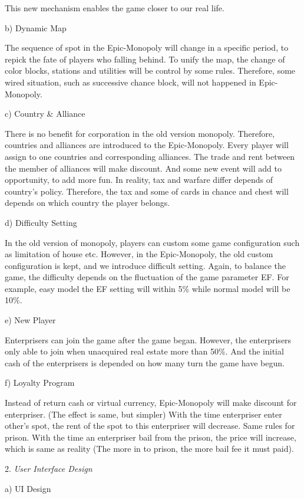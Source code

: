 \documentclass[a4paper,11pt]{article}
\begin{document}
This new mechanism enables the game closer to our real life.

b)	Dynamic Map

The sequence of spot in the Epic-Monopoly will change in a specific period, to repick the fate of players who falling behind. To unify the map, the change of color blocks, stations and utilities will be control by some rules. Therefore, some wired situation, such as successive chance block, will not happened in Epic-Monopoly.

c)	Country \& Alliance

There is no benefit for corporation in the old version monopoly. Therefore, countries and alliances are introduced to the Epic-Monopoly. Every player will assign to one countries and corresponding alliances. The trade and rent between the member of alliances will make discount. And some new event will add to opportunity, to add more fun. In reality, tax and warfare differ depends of country's policy. Therefore, the tax and some of cards in chance and chest will depends on which country the player belongs.

d)	Difficulty Setting

In the old version of monopoly, players can custom some game configuration such as limitation of house etc. However, in the Epic-Monopoly, the old custom configuration is kept, and we introduce difficult setting. Again, to balance the game, the difficulty depends on the fluctuation of the game parameter EF. For example, easy model the EF setting will within 5\% while normal model will be 10\%. 

e)	New Player

Enterprisers can join the game after the game began. However, the enterprisers only able to join when unacquired real estate more than 50\%. And the initial cash of the enterprisers is depended on how many turn the game have begun.

f)	Loyalty Program

Instead of return cash or virtual currency, Epic-Monopoly will make discount for enterpriser. (The effect is same, but simpler) With the time enterpriser enter other's spot, the rent of the spot to this enterpriser will decrease. Same rules for prison. With the time an enterpriser bail from the prison, the price will increase, which is same as reality (The more in to prison, the more bail fee it must paid).

2.	\emph{User Interface Design}

a)	UI Design
\end{document}
